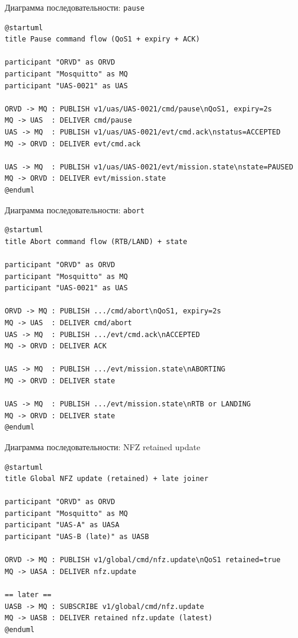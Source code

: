 \documentclass[aspectratio=169]{beamer}
\begin{document}
\begin{frame}{Диаграмма последовательности: \texttt{pause}}
\small
\begin{verbatim}
@startuml
title Pause command flow (QoS1 + expiry + ACK)

participant "ORVD" as ORVD
participant "Mosquitto" as MQ
participant "UAS-0021" as UAS

ORVD -> MQ : PUBLISH v1/uas/UAS-0021/cmd/pause\nQoS1, expiry=2s
MQ -> UAS  : DELIVER cmd/pause
UAS -> MQ  : PUBLISH v1/uas/UAS-0021/evt/cmd.ack\nstatus=ACCEPTED
MQ -> ORVD : DELIVER evt/cmd.ack

UAS -> MQ  : PUBLISH v1/uas/UAS-0021/evt/mission.state\nstate=PAUSED
MQ -> ORVD : DELIVER evt/mission.state
@enduml
\end{verbatim}
\end{frame}

\begin{frame}{Диаграмма последовательности: \texttt{abort}}
\small
\begin{verbatim}
@startuml
title Abort command flow (RTB/LAND) + state

participant "ORVD" as ORVD
participant "Mosquitto" as MQ
participant "UAS-0021" as UAS

ORVD -> MQ : PUBLISH .../cmd/abort\nQoS1, expiry=2s
MQ -> UAS  : DELIVER cmd/abort
UAS -> MQ  : PUBLISH .../evt/cmd.ack\nACCEPTED
MQ -> ORVD : DELIVER ACK

UAS -> MQ  : PUBLISH .../evt/mission.state\nABORTING
MQ -> ORVD : DELIVER state

UAS -> MQ  : PUBLISH .../evt/mission.state\nRTB or LANDING
MQ -> ORVD : DELIVER state
@enduml
\end{verbatim}
\end{frame}

\begin{frame}{Диаграмма последовательности: NFZ retained update}
\small
\begin{verbatim}
@startuml
title Global NFZ update (retained) + late joiner

participant "ORVD" as ORVD
participant "Mosquitto" as MQ
participant "UAS-A" as UASA
participant "UAS-B (late)" as UASB

ORVD -> MQ : PUBLISH v1/global/cmd/nfz.update\nQoS1 retained=true
MQ -> UASA : DELIVER nfz.update

== later ==
UASB -> MQ : SUBSCRIBE v1/global/cmd/nfz.update
MQ -> UASB : DELIVER retained nfz.update (latest)
@enduml
\end{verbatim}
\end{frame}
\end{document}
